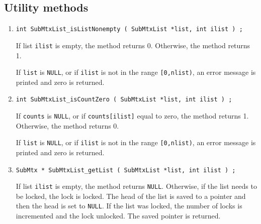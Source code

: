 \subsection{Utility methods}
\label{subsection:SubMtxList:proto:utility}
\par
\begin{enumerate}
\item
\begin{verbatim}
int SubMtxList_isListNonempty ( SubMtxList *list, int ilist ) ;
\end{verbatim}
\par
If list {\tt ilist} is empty, the method returns 0.
Otherwise, the method returns 1.
\par {}
If {\tt list} is {\tt NULL},
or if {\tt ilist} is not in the range {\tt [0,nlist)},
an error message is printed and zero is returned.
\item
\begin{verbatim}
int SubMtxList_isCountZero ( SubMtxList *list, int ilist ) ;
\end{verbatim}
\par
If {\tt counts} is {\tt NULL}, 
or if {\tt counts[ilist]} equal to zero, the method returns 1.
Otherwise, the method returns 0.
\par {}
If {\tt list} is {\tt NULL},
or if {\tt ilist} is not in the range {\tt [0,nlist)},
an error message is printed and zero is returned.
\item
\begin{verbatim}
SubMtx * SubMtxList_getList ( SubMtxList *list, int ilist ) ;
\end{verbatim}
\par
If list {\tt ilist} is empty, the method returns {\tt NULL}.
Otherwise, if the list needs to be locked, the lock is locked.
The head of the list is saved to a pointer and then the head is set
to {\tt NULL}.
If the list was locked, the number of locks is incremented and the
lock unlocked.
The saved pointer is returned.
\par {}

\end{enumerate}
